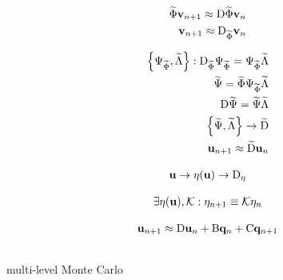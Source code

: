 \begin{align}
    \widetilde{\Phi} \vunk_{n+1} \approx  \matr{D} \widetilde{\Phi} \vunk_{n} \\
    \vunk_{n+1} \approx  \matr{D}_{\widetilde{\Phi}} \vunk_{n} \\
\end{align}

\begin{align}
    \left\{ \Psi_{\widetilde{\Phi}},  \widetilde{\Lambda} \right\} : \matr{D}_{\widetilde{\Phi}}  \Psi_{\widetilde{\Phi}} = \Psi_{\widetilde{\Phi}} \widetilde{\Lambda} \\
    \widetilde{\Psi} = \widetilde{\Phi} \Psi_{\widetilde{\Phi}} \widetilde{\Lambda} \\
    \matr{D} \widetilde{\Psi} = \widetilde{\Psi}\widetilde{\Lambda} \\
    \left\{\widetilde{\Psi},  \widetilde{\Lambda} \right\} \rightarrow \widetilde{\matr{D}}\\
    \unk_{n+1} \approx \widetilde{\matr{D}} \unk_{n}
\end{align}

\begin{align}
   \unk \rightarrow \nlin(\unk) \rightarrow \matr{D}_{\nlin}
\end{align}

\begin{align}
    \exists \nlin(\unk), \matr{\mathcal{K}} : \nlin_{n+1} \equiv \matr{\mathcal{K}}  \nlin_{n}
 \end{align}

\begin{align}
    \unk_{n+1} \approx \matr{D} \unk_{n} + \matr{B} \bvec{q}_{n} + \matr{C} \bvec{q}_{n+1}
\end{align}

\subsection{}

\begin{figure}[ht]
    \caption{ \cite{Elizarev2022}}\label{fig:ROM-II}
\end{figure}

\subsubsection{}

multi-level Monte Carlo

